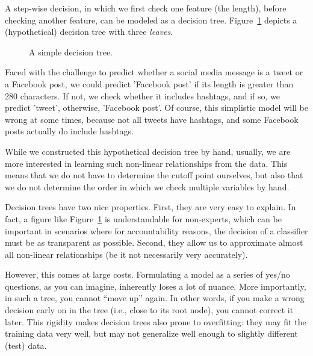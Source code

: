 A step-wise decision, in which we first check one feature (the
length), before checking another feature, can be modeled as a decision
tree.  Figure~\ref{fig:decisiontree} depicts a (hypothetical) decision
tree with three \textit{leaves}.

\begin{figure}
  \centering
{}
  \caption{\label{fig:decisiontree}A simple decision tree.}
\end{figure}

Faced with the challenge to predict whether a social media message is
a tweet or a Facebook post, we could predict 'Facebook post' if its
length is greater than 280 characters. If not, we check whether it
includes hashtags, and if so, we predict 'tweet', otherwise, 'Facebook
post'.
Of course, this simplistic model will be wrong at some times, because
not all tweets have hashtags, and some Facebook posts actually do
include hashtags.

While we constructed this hypothetical decision tree by hand, usually,
we are more interested in learning such non-linear relationships from
the data.  This means that we do not have to determine the cutoff
point ourselves, but also that we do not determine the order in which
we check multiple variables by hand.

Decision trees have two nice properties. First, they are very easy to
explain.  In fact, a figure like Figure~\ref{fig:decisiontree} is
understandable for non-experts, which can be important in scenarios
where for accountability reasons, the decision of a classifier must be
as transparent as possible.  Second, they allow us to approximate
almost all non-linear relationships (be it not necessarily very
accurately).

However, this comes at large costs.  Formulating a model as a series
of yes/no questions, as you can imagine, inherently loses a lot of
nuance. More importantly, in such a tree, you cannot ``move up''
again. In other words, if you make a wrong decision early on in the
tree (i.e., close to its root node), you cannot correct it later.
This rigidity makes decision trees also prone to overfitting: they may
fit the training data very well, but may not generalize well enough to
slightly different (test) data.

